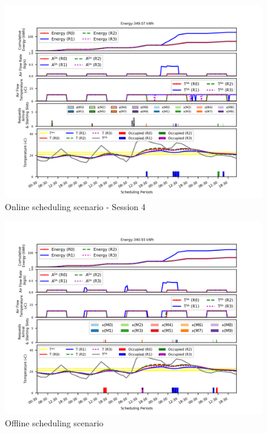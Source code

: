 \begin{figure}[t]
\centering
\includegraphics[width=1\linewidth]{figs/online_r3.png}	
\vspace*{-2ex}
\caption{Online scheduling scenario - Session 4}
\label{fig:online_eg4}
\end{figure}

\begin{figure}[t]
\centering
\includegraphics[width=1\linewidth]{figs/online_oracle.png}	
\vspace*{-2ex}
\caption{Offline scheduling scenario}
\label{fig:online_offline}
\end{figure}

